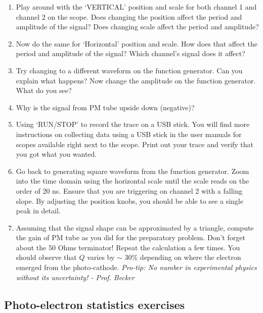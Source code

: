 \documentclass[10pt,aps,twocolumn,secnumarabic,balancelastpage,amsmath,amssymb,nofootinbib,floatfix]{revtex4}
\begin{document}
\begin{enumerate}
\item Play around with the `VERTICAL' position and scale for both channel 1 and channel 2 on the scope. Does changing the position affect the period and amplitude of the signal? Does changing scale affect the period and amplitude? 

\item Now do the same for `Horizontal' position and scale. How does that affect the period and amplitude of the signal? Which channel's signal does it affect?

\item Try changing to a different waveform on the function generator. Can you explain what happens? Now change the amplitude on the function generator. What do you see?

\item Why is the signal from PM tube upside down (negative)?

\item Using `RUN/STOP' to record the trace on a USB stick. You will find more instructions on collecting data using a USB stick in the user manuals for scopes available right next to the scope. Print out your trace and verify that you got what you wanted. 

\item Go back to generating square waveform from the function generator. Zoom into the time domain using the horizontal scale until the scale reads on the order of 20 ns. Ensure that you are triggering on channel 2 with a falling slope. By adjusting the position knobs, you should be able to see a single peak in detail. 

\item Assuming that the signal shape can be approximated by a triangle, compute the gain of PM tube as you did for the preparatory problem. Don't forget about the 50 Ohms terminator! Repeat the calculation a few times. You should observe that $Q$ varies by $\sim$ 30\% depending on where the electron emerged from the photo-cathode. {\it Pro-tip: No number in experimental physics without its uncertainty! - Prof. Becker}

\end{enumerate}

\subsection{Photo-electron statistics exercises}
\end{document}
